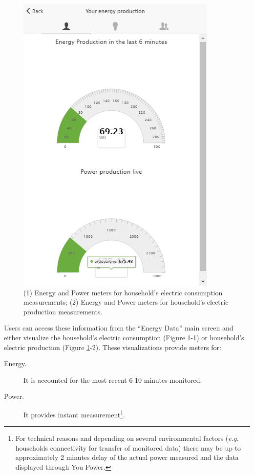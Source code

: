 \begin{figure}[htb]
\begin{center}
\begin{minipage}[htb]{0.33\linewidth}
         \includegraphics[width=1\linewidth]{img/visual_production.png}  
        \end{minipage}
      \end{center}
    \caption{(1) Energy and Power meters for household's electric consumption measurements; (2) Energy and Power meters for household's electric production measurements.
}
\label{fig:viz_rt}
\end{figure}

Users can access these information from the ``Energy Data'' main screen and either visualize the household's electric consumption (Figure \ref{fig:viz_rt}-1) or
household's electric production (Figure \ref{fig:viz_rt}-2).
These visualizations provide meters for:
\begin{description}
 \item[Energy.] It is accounted for the most recent 6-10 minutes monitored.
 \item[Power.] It provides instant measurement\footnote{For technical reasons and depending on several environmental factors (\textit{e.g.} households connectivity for transfer of monitored data) there may be up to approximately 2 minutes delay of the actual power measured and the data displayed through You Power.}.
\end{description}




